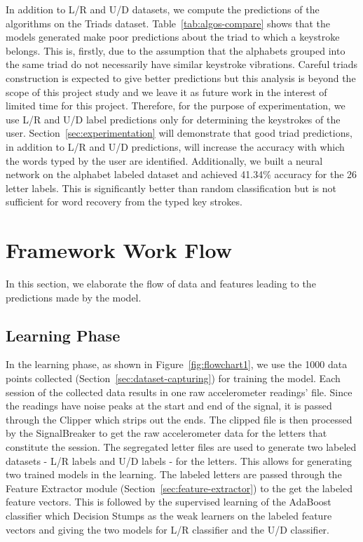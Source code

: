 \documentclass[11pt,conference]{IEEEtran}
\begin{document}
In addition to L/R and U/D datasets, we compute the predictions of the algorithms on the Triads dataset. Table~\ref{tab:algos-compare} shows that the models generated make poor predictions about the triad to which a keystroke belongs. This is, firstly, due to the assumption that the alphabets grouped into the same triad do not necessarily have similar keystroke vibrations. Careful triads construction is expected to give better predictions but this analysis is beyond the scope of this project study and we leave it as future work in the interest of limited time for this project. Therefore, for the purpose of experimentation, we use L/R and U/D label predictions only for determining the keystrokes of the user. Section~\ref{sec:experimentation} will demonstrate that good triad predictions, in addition to L/R and U/D predictions, will increase the accuracy with which the words typed by the user are identified. Additionally, we built a neural network on the alphabet labeled dataset and achieved 41.34\% accuracy for the 26 letter labels. This is significantly better than random classification but is not sufficient for word recovery from the typed key strokes.

\section{Framework Work Flow}
\label{sec:framework}
\noindent In this section, we elaborate the flow of data and features leading to the
predictions made by the model.
\subsection{Learning Phase}
\label{sec:learning}
\noindent In the learning phase, as shown in Figure~\ref{fig:flowchart1}, we use the 1000 data points collected (Section~\ref{sec:dataset-capturing})
for training the model. Each session of the collected data results in one raw accelerometer readings' file.
Since the readings have noise peaks at the start and end of the signal, it is passed through the Clipper
which strips out the ends. The clipped file is then processed by the SignalBreaker to
get the raw accelerometer data for the letters that constitute the session. The segregated letter files are used
to generate two labeled datasets - L/R labels and U/D labels - for the letters. This allows for generating two
trained models in the learning. The labeled letters are passed through the Feature Extractor module
(Section~\ref{sec:feature-extractor}) to the get the labeled
feature vectors. This is followed by the supervised learning of the AdaBoost classifier which Decision Stumps
as the weak learners on the labeled feature vectors and giving the two models for L/R classifier and
the U/D classifier.
\end{document}
